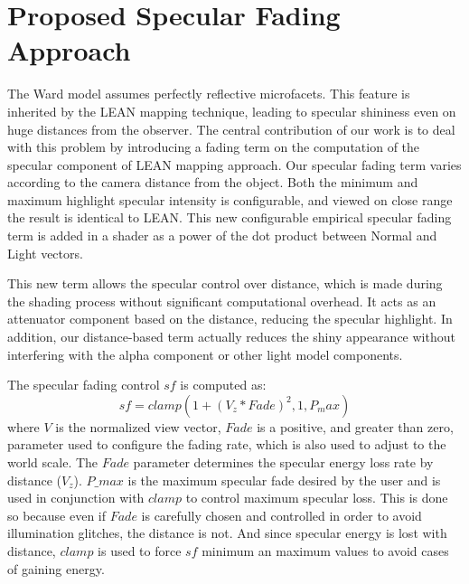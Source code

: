 \documentclass[10pt, conference]{IEEEtran}
\begin{document}
\section{Proposed Specular Fading Approach}
\label{sec:specular_fading}
%
The Ward model assumes perfectly reflective microfacets. This feature is inherited by the LEAN mapping technique, leading to specular shininess even on huge distances from the observer. The central contribution of our work is to deal with this problem by introducing a fading term on the computation of the specular component of LEAN mapping approach. Our specular fading term varies according to the camera distance from the object. Both the minimum and maximum highlight specular intensity is configurable, and viewed on close range the result is identical to LEAN. This new configurable empirical specular fading term is added in a shader as a power of the dot product between Normal and Light vectors.

This new term allows the specular control over distance, which is made during the shading process without significant computational overhead. It acts as an attenuator component based on the distance, reducing the specular highlight. In addition, our distance-based term actually reduces the shiny appearance without interfering with the alpha component or other light model components.

The specular fading control $sf$ is computed as:
\begin{equation}
	\label{eq:sf}
	sf = clamp(1 + (V_{z} * Fade)^{2}, 1, P_max)
\end{equation}
where $V$ is the normalized view vector, $Fade$ is a positive, and greater than zero, parameter used to configure the fading rate, which is also used to adjust to the world scale. The $Fade$ parameter determines the specular energy loss rate by distance ($V_{z}$). $P\_{max}$ is the maximum specular fade desired by the user and is used in conjunction with $clamp$ to control maximum specular loss. This is done so because even if $Fade$ is carefully chosen and controlled in order to avoid illumination glitches, the distance is not. And since specular energy is lost with distance, $clamp$ is used to force $sf$ minimum an maximum values to avoid cases of gaining energy.
\end{document}
